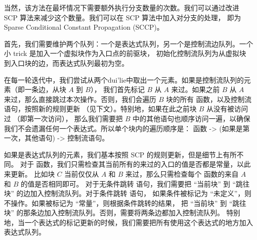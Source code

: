 当然，该方法在最坏情况下需要额外执行分支数量的次数。我们可以通过改进 SCP 算法来减少这个数量。我们可以在 SCP 算法中加入对分支的处理，
即为 Sparse Conditional Constant Propagation (SCCP)。

首先，我们需要维护两个队列：一个是表达式队列，另一个是控制流边队列。一个小 trick 是加入一个虚拟块作为入口点的前驱块，
初始化控制流队列为从虚拟块到入口块的边，而表达式队列最初为空。

在每一轮迭代中，我们尝试从两个dui'lie中取出一个元素。如果是控制流队列的元素（即一条边，从块 $A$ 到 $B$），
我们首先标记 $B$ 从 $A$ 来过。如果之前 $B$ 从 $A$ 来过，那么直接跳过本次操作。否则，我们会遍历 $B$ 块的所有
 函数，以及控制流语句，按照新的规则更新 （见下文）。特别地，如果在此之前块 $B$ 从没有被访问过 （即第一次访问），
那么我们需要把 $B$ 中的其他语句也顺序访问一遍，以确保我们不会遗漏任何一个表达式。所以单个块内的遍历顺序是：
 函数 -> (如果是第一次，其他语句) -> 控制流语句。

如果是表达式队列的元素，我们基本按照 SCP 的规则更新，但是细节上有所不同。
对于  函数，我们只需检查其当前所有的来过的入口的值是否都是常量，以此来更新。
比如块 $C$ 当前仅仅从 $A$ 和 $B$ 来过，那么只需检查每个  函数的来自 $A$ 和 $B$ 的值是否相同即可。
对于无条件跳转  语句，我们需要把 “当前块” 到 “跳往块” 的边加入控制流队列。对于条件跳转  语句，
如果条件被标记为 “未定义”，则不操作。如果被标记为 “常量”，则根据条件跳转的结果，
把 “当前块” 到 “跳往块” 的那条边加入控制流队列。否则，需要将两条边都加入控制流队列。
特别地，当一个表达式的标记更新的时候，我们需要把所有使用这个表达式的地方加入表达式队列。
